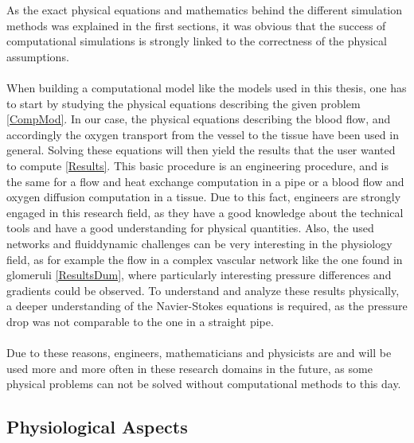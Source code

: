 As the exact physical equations and mathematics behind the different simulation methods was explained in the first sections, it was obvious that the success of computational simulations is strongly linked to the correctness of the physical assumptions.\\
\\When building a computational model like the models used in this thesis, one has to start by studying the physical equations describing the given problem \ref{CompMod}. In our case, the physical equations describing the blood flow, and accordingly the oxygen transport from the vessel to the tissue have been used in general. Solving these equations will then yield the results that the user wanted to compute \ref{Results}. This basic procedure is an engineering procedure, and is the same for a flow and heat exchange computation in a pipe or a blood flow and oxygen diffusion computation in a tissue. Due to this fact, engineers are strongly engaged in this research field, as they have a good knowledge about the technical tools and have a good understanding for physical quantities. Also, the used networks and fluiddynamic challenges can be very interesting in the physiology field, as for example the flow in a complex vascular network like the one found in glomeruli \ref{ResultsDum}, where particularly interesting pressure differences and gradients could be observed. To understand and analyze these results physically, a deeper understanding of the Navier-Stokes equations is required, as the pressure drop was not comparable to the one in a straight pipe.\\
\\Due to these reasons, engineers, mathematicians and physicists are and will be used more and more often in these research domains in the future, as some physical problems can not be solved without computational methods to this day.

\subsection{Physiological Aspects}

